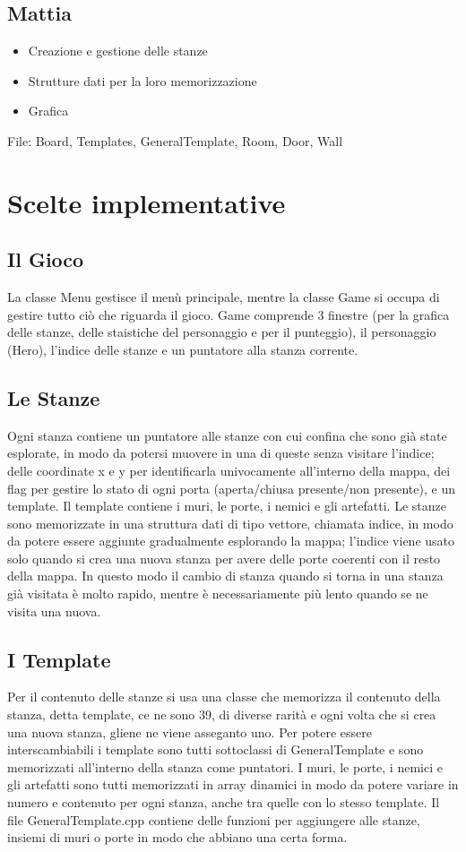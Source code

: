 \documentclass[12pt]{article}
\begin{document}
\subsection*{Mattia}
\begin{itemize}
    \item Creazione e gestione delle stanze 
    \item Strutture dati per la loro memorizzazione
    \item Grafica
\end{itemize}
File: Board, Templates, GeneralTemplate, Room, Door, Wall

\newpage
\section*{Scelte implementative}
\subsection*{Il Gioco}
La classe Menu gestisce il menù principale, mentre la classe Game si occupa di gestire tutto ciò che riguarda il gioco.
Game comprende 3 finestre (per la grafica delle stanze, delle staistiche del personaggio e per il punteggio), il personaggio (Hero), l'indice delle stanze e un puntatore alla stanza corrente.

\subsection*{Le Stanze}
Ogni stanza contiene un puntatore alle stanze con cui confina che sono già state esplorate, in modo da potersi muovere in una di queste senza visitare l'indice; delle coordinate x e y per identificarla univocamente all'interno della mappa, dei flag per gestire lo stato di ogni porta (aperta/chiusa presente/non presente), e un template. Il template contiene i muri, le porte, i nemici e gli artefatti.
Le stanze sono memorizzate in una struttura dati di tipo vettore, chiamata indice, in modo da potere essere aggiunte gradualmente esplorando la mappa; l'indice viene usato solo quando si crea una nuova stanza per avere delle porte coerenti con il resto della mappa.
In questo modo il cambio di stanza quando si torna in una stanza già visitata è molto rapido, mentre è necessariamente più lento quando se ne visita una nuova. 

\subsection*{I Template}
Per il contenuto delle stanze si usa una classe che memorizza il contenuto della stanza, detta template, ce ne sono 39, di diverse rarità e ogni volta che si crea una nuova stanza, gliene ne viene asseganto uno.
Per potere essere interscambiabili i template sono tutti sottoclassi di GeneralTemplate e sono memorizzati all'interno della stanza come puntatori.
I muri, le porte, i nemici e gli artefatti sono tutti memorizzati in array dinamici in modo da potere variare in numero e contenuto per ogni stanza, anche tra quelle con lo stesso template.
Il file GeneralTemplate.cpp contiene delle funzioni per aggiungere alle stanze, insiemi di muri o porte in modo che abbiano una certa forma.
\end{document}
